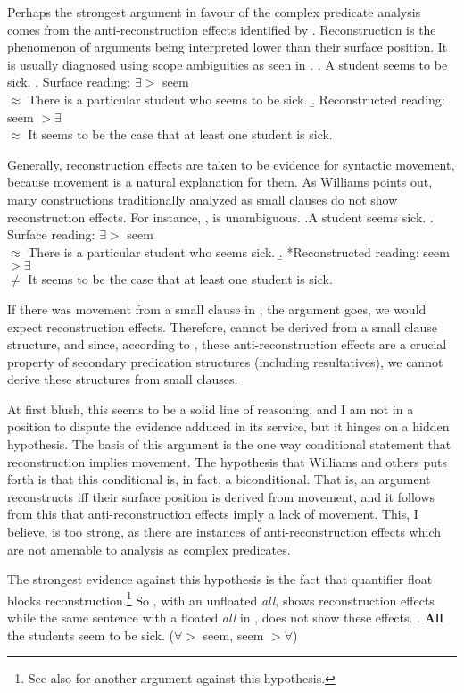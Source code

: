 \documentclass[MilwayThesis]{subfiles}
\begin{document}
Perhaps the strongest argument in favour of the complex predicate analysis comes from the anti-reconstruction effects identified by \textcite[293--296]{williams1983against}.
Reconstruction is the phenomenon of arguments being interpreted lower than their surface position.
It is usually diagnosed using scope ambiguities as seen in \Next.
\ex. A student seems to be sick.
\a. Surface reading: $\exists >$ seem\\
$\approx$ There is a particular student who seems to be sick.
\b. Reconstructed reading: seem $> \exists$\\
$\approx$ It seems to be the case that at least one student is sick.

Generally, reconstruction effects are taken to be evidence for syntactic movement, because movement is a natural explanation for them.
As Williams points out, many constructions traditionally analyzed as small clauses do not show reconstruction effects.
For instance, \Next, is unambiguous.
\ex.A student seems sick.
\a. Surface reading: $\exists >$ seem\\
$\approx$ There is a particular student who seems sick.
\b. *Reconstructed reading: seem $> \exists$\\
$\neq$ It seems to be the case that at least one student is sick.

If there was movement from a small clause in \Last, the argument goes, we would expect reconstruction effects.
Therefore, \Last cannot be derived from a small clause structure, and since, according to \textcite{irimia2012secondary}, these anti-reconstruction effects are a crucial property of secondary predication structures (including resultatives), we cannot derive these structures from small clauses.

At first blush, this seems to be a solid line of reasoning, and I am not in a position to dispute the evidence adduced in its service, but it hinges on a hidden hypothesis.
The basis of this argument is the one way conditional statement that reconstruction implies movement.
The hypothesis that Williams and others puts forth is that this conditional is, in fact, a biconditional.
That is, an argument reconstructs iff their surface position is derived from movement, and it follows from this that anti-reconstruction effects imply a lack of movement.
This, I believe, is too strong, as there are instances of anti-reconstruction effects which are not amenable to analysis as complex predicates.

The strongest evidence against this hypothesis is the fact that quantifier float blocks reconstruction.\footnote{See also \textcite{bobaljik2004anti} for another argument against this hypothesis.}
So \Next, with an unfloated \textit{all}, shows reconstruction effects while the same sentence with a floated \textit{all} in \NNext, does not show these effects.
\ex. \textbf{All} the students seem to be sick. ($\forall >$ seem, seem $> \forall$)
\end{document}
